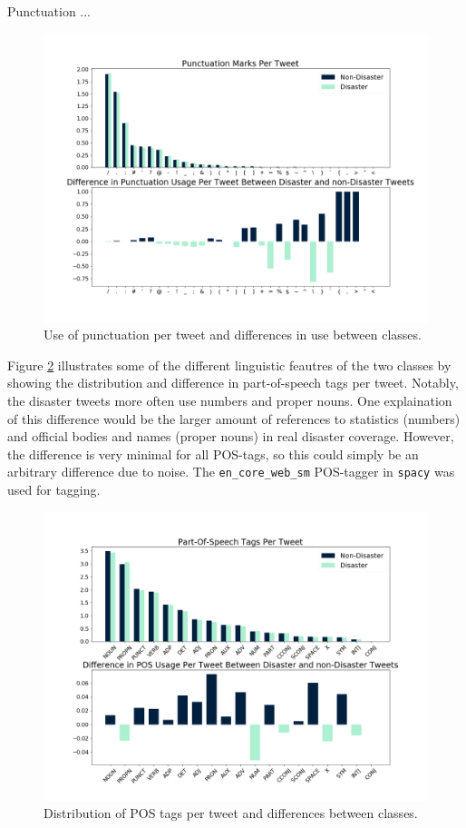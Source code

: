 \documentclass[journal, ]{IEEEtran}
\let\MYoriglatexcaption\caption
\renewcommand{\caption}[2][\relax]{\MYoriglatexcaption[#2]{#2}}
\begin{document}
Punctuation ...
\begin{figure}[hbt!]
  \centering
  \includegraphics[width=\linewidth]{../figures/punctuation.png}
  \caption{Use of punctuation per tweet and differences in use between classes.}
  \label{fig:punctuation}
\end{figure}

Figure \ref{fig:part_of_speech} illustrates some of the different linguistic
feautres of the two classes by showing the distribution and difference in
part-of-speech tags per tweet. Notably, the disaster tweets more often use
numbers and proper nouns. One explaination of this difference would be the
larger amount of references to statistics (numbers) and official bodies and
names (proper nouns) in real disaster coverage. However, the difference is very
minimal for all POS-tags, so this could simply be an arbitrary difference due
to noise. The \texttt{en\_core\_web\_sm} POS-tagger in \texttt{spacy} was used for
tagging.

\begin{figure}[hbt!]
  \centering
  \includegraphics[width=\linewidth]{../figures/part_of_speech.png}
  \caption{Distribution of POS tags per tweet and differences between classes.}
  \label{fig:part_of_speech}
\end{figure}
\end{document}
